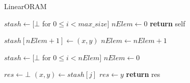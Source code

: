 \begin{algorithm}
\caption{LinearORAM}
\label{alg:obliv_set}
\begin{algorithmic}[1]


\State $stash \gets [ \bot $ for $0 \leq i < max\_size]$
\State $nElem \gets 0$
\State \textbf{return} self
\EndProcedure

\State

\State $stash[nElem + 1] \gets (x, y)$
\State $nElem \gets nElem + 1$
\EndProcedure

\State

\State $stash \gets [ \bot $ for $0 \leq i < nElem]$
\State $nElem \gets 0$
\EndProcedure

\State

\State $res \gets \bot$
    \State $(x, y) \gets stash[j]$
        \State $res \gets y$
    \EndOblivIf
\EndFor
\State \textbf{return} res
\EndProcedure

\end{algorithmic}
\end{algorithm}



